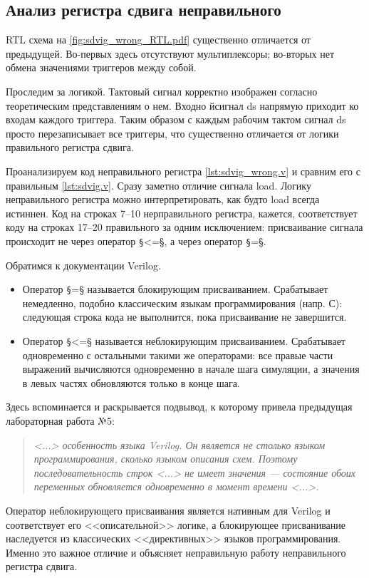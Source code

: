 \subsection*{Анализ регистра сдвига неправильного}
RTL схема на \cref{fig:sdvig_wrong_RTL.pdf} существенно отличается от предыдущей. Во-первых здесь отсутствуют мультиплексоры; во-вторых нет обмена значениями триггеров между собой.

Проследим за логикой. Тактовый сигнал корректно изображен согласно теоретическим представлениям о нем. Входно йсигнал ds напрямую приходит ко входам каждого триггера. Таким образом с каждым рабочим тактом сигнал ds просто перезаписывает все триггеры, что существенно отличается от логики правильного регистра сдвига.

Проанализируем код неправильного регистра \cref{lst:sdvig_wrong.v} и сравним его с правильным \cref{lst:sdvig.v}. Сразу заметно отличие сигнала load. Логику неправильного регистра можно интерпретировать, как будто load всегда истиннен. Код на строках 7--10 нерправильного регистра, кажется, соответствует коду на строках 17--20 правильного за одним исключением: присваивание сигнала происходит не через оператор \texttt§<=§, а через оператор \texttt§=§.

Обратимся к документации Verilog.
\begin{itemize}
    \item Оператор \texttt§=§ называется блокирующим присваиванием. Срабатывает немедленно, подобно классическим языкам программирования (напр. С): следующая строка кода не выполнится, пока присваивание не завершится.
    \item Оператор \texttt§<=§ называется неблокирующим присваиванием. Срабатывает одновременно с остальными такими же операторами: все правые части выражений вычисляются одновременно в начале шага симуляции, а значения в левых частях обновляются только в конце шага.
\end{itemize}
Здесь вспоминается и раскрывается подвывод, к которому привела предыдущая лабораторная работа №5:
\begin{quote}
    {\itshape
        <...> особенность языка Verilog.
        Он является не столько языком программирования, сколько языком описания схем. Поэтому последовательность строк <...> не имеет значения --- состояние обоих переменных обновляется одновременно в момент времени <...>.
    }
\end{quote}
Оператор неблокирующего присваивания является нативным для Verilog и соответствует его <<описательной>> логике, а блокирующее присванивание наследуется из классических <<директивных>> языков программирования. Именно это важное отличие и объясняет неправильную работу неправильного регистра сдвига.



